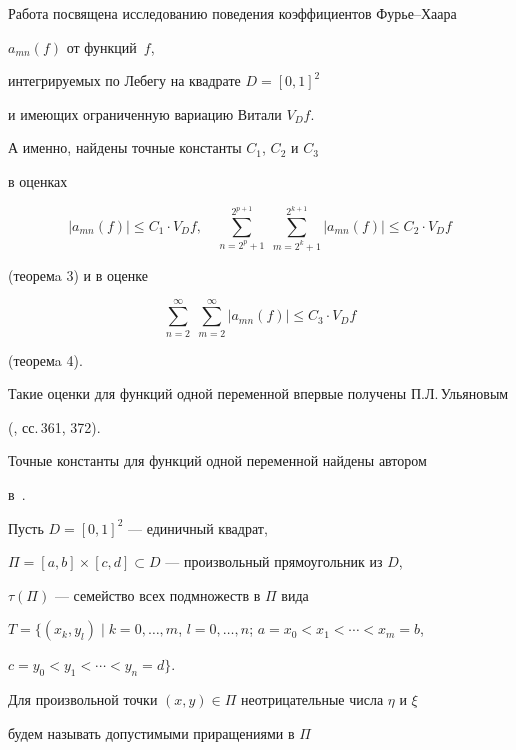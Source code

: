 \label{begin}








Работа посвящена исследованию поведения коэффициентов Фурье--Хаара


$a_{mn}(f)$ от функций~$f$,


интегрируемых по Лебегу на квадрате $D=[0,1]^2$


и имеющих ограниченную вариацию Витали $V_D f$.


А именно, найдены точные константы $C_1$, $C_2$ и $C_3$


в оценках


$$


|a_{mn}(f)| \leqslant C_1\cdot V_D f, \quad


\sum_{n=2^p+1}^{2^{p+1}}\; \sum_{m=2^k+1}^{2^{k+1}} |a_{mn}(f)|


\leqslant C_2\cdot V_D f


$$


(теоремa 3) и в оценке


$$


\sum_{n=2}^{\infty}\; \sum_{m=2}^{\infty}


|a_{mn}(f)| \leqslant C_3\cdot V_D f


$$


(теоремa 4).





Такие оценки для функций одной переменной впервые получены П.Л.\,Ульяновым


(\cite{1}, сс.\,361, 372).


Точные константы для функций одной переменной найдены автором


в~\cite{2}.





\medskip


Пусть $D=[0,1]^2$ --- единичный квадрат,


$\Pi=[a,b]\times[c,d] \subset D$ --- произвольный прямоугольник из $D$,


$\tau(\Pi)$ --- семейство всех подмножеств в $\Pi$ вида


$T=\{(x_k,y_l) \mid k=0,\dotsc,m$, $l=0,\dotsc,n$; $a=x_0<x_1<\dotsb<x_m=b$,


$c=y_0<y_1<\dotsb<y_n=d\}$.


Для произвольной точки $(x,y){\in}\Pi$ неотрицательные числа $\eta$ и $\xi$


будем называть допустимыми приращениями в $\Pi$


